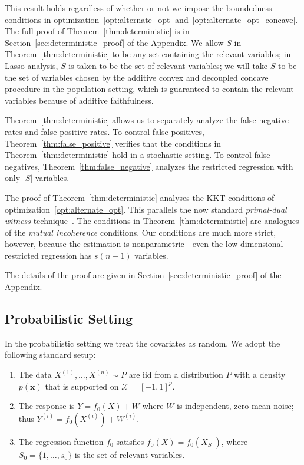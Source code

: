 This result holds regardless of whether or not we impose the boundedness conditions in optimization~\eqref{opt:alternate_opt} and~\eqref{opt:alternate_opt_concave}.
The full proof of Theorem~\ref{thm:deterministic} is in Section~\ref{sec:deterministic_proof} of the Appendix. We allow $S$ in Theorem~\ref{thm:deterministic} to be any set containing the relevant variables; in Lasso analysis, $S$ is taken to be the set of relevant variables; we will take $S$ to be the set of variables chosen by the additive convex and decoupled concave procedure in the population setting, which is guaranteed to contain the relevant variables because of additive faithfulness.

Theorem~\ref{thm:deterministic} allows us to separately analyze the false negative
rates and false positive rates. To control false positives,
Theorem~\ref{thm:false_positive} verifies that the conditions in Theorem~\ref{thm:deterministic} hold in a stochastic setting. To control
false negatives, Theorem~\ref{thm:false_negative} analyzes the restricted regression with only $|S|$ variables.

The proof of Theorem~\ref{thm:deterministic} analyses the KKT
conditions of optimization~\eqref{opt:alternate_opt}.  This parallels
the now standard \emph{primal-dual witness}
technique~\citep{wainwright2009sharp}. The conditions in
Theorem~\ref{thm:deterministic} are analogues of the \emph{mutual
  incoherence} conditions. Our conditions are much more strict, however,
because the estimation is nonparametric---even the low dimensional
restricted regression has $s(n-1)$ variables.

The details of the proof are given in
Section~\ref{sec:deterministic_proof} of the Appendix.

\subsection{Probabilistic Setting}
\label{sec:probabilistic_setting}

In the probabilistic setting we treat the covariates as random.  We
adopt the following standard setup:

\begin{enumerate}
\item The data $X^{(1)},\ldots, X^{(n)} \sim P$ are iid from
a distribution $P$ with a density $p(\mathbf{x})$ that is supported on $\mathcal{X}=[-1,1]^p$.
\item The response is $Y = f_0(X) + W$ where $W$ is
  independent, zero-mean noise; thus $Y^{(i)} = f_0(X^{(i)}) + W^{(i)}$.
\item The regression function $f_0$ satisfies
$f_0(X) = f_0(X_{S_0})$, where $S_0 = \{1,\ldots,s_0\}$ is the set of
relevant variables.
\end{enumerate}


